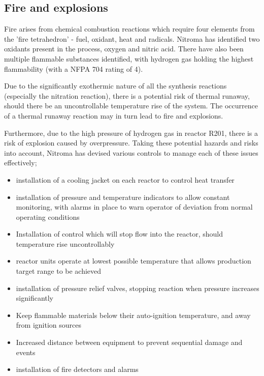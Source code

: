 \subsection{Fire and explosions}

Fire arises from chemical combustion reactions which require four elements from the 'fire tetrahedron' - fuel, oxidant, heat and radicals. Nitroma has identified two oxidants present in the process, oxygen and nitric acid. There have also been multiple flammable substances identified, with hydrogen gas holding the highest flammability (with a NFPA 704 rating of 4). 

Due to the significantly exothermic nature of all the synthesis reactions (especially the nitration reaction), there is a potential risk of thermal runaway, should there be an uncontrollable temperature rise of the system. The occurrence of a thermal runaway reaction may in turn lead to fire and explosions.  

Furthermore, due to the high pressure of hydrogen gas in reactor R201, there is a risk of explosion caused by overpressure. Taking these potential hazards and risks into account, Nitroma has devised various controls to manage each of these issues effectively; 


\begin{itemize}
    \item installation of a cooling jacket on each reactor to control heat transfer
    \item installation of pressure and temperature indicators to allow constant monitoring, with alarms in place to warn operator of deviation from normal operating conditions
    \item Installation of control which will stop flow into the reactor, should temperature rise uncontrollably
    \item reactor units operate at lowest possible temperature that allows production target range to be achieved
    \item installation of pressure relief valves, stopping reaction when pressure increases significantly %
    \item Keep flammable materials below their auto-ignition temperature, and away from ignition sources
    \item Increased distance between equipment to prevent sequential damage and events
    \item installation of fire detectors and alarms
    
\end{itemize}


